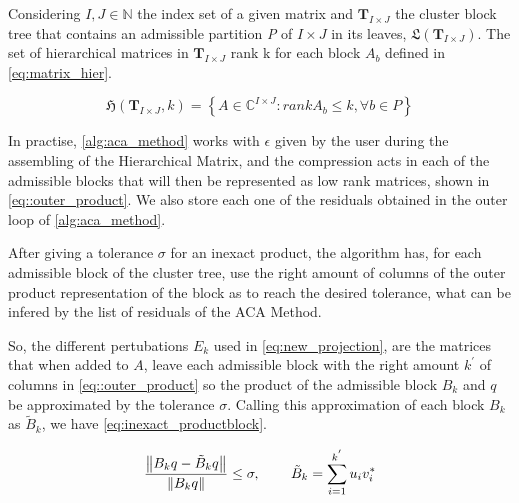 Considering $I,J \in \mathbb{N}$ the index set of a given matrix and $\mathbf{T}_{I \times J}$ the cluster block tree that contains an admissible partition \textit{P} of $ I \times J$ in its leaves, $\mathfrak{L}(\mathbf{T}_{I \times J})$. The set of hierarchical matrices in $\mathbf{T}_{I \times J}$ rank k for each block $A_{b}$ defined in \ref{eq:matrix_hier}.

\begin{equation}\label{eq:matrix_hier}
    \mathfrak{H}(\mathbf{T}_{I \times J},k) = \left\{  A\in \mathbb{C}^{I\times J} : rankA_{b} \leq k, \forall b \in P \right\}
\end{equation}


In practise, \ref{alg:aca_method} works with $\epsilon$ given by the user during the assembling of the Hierarchical Matrix, and the compression acts in each of the admissible blocks that will then be represented as low rank matrices, shown in \ref{eq::outer_product}. We also store each one of the residuals obtained in the outer loop of \ref{alg:aca_method}. 

After giving a tolerance $\sigma$ for an inexact product, the algorithm has, for each admissible block of the cluster tree, use the right amount of columns of the outer product representation of the block as to reach the desired tolerance, what can be infered by the list of residuals of the ACA Method.

So, the different pertubations $E_{k}$ used in \ref{eq:new_projection}, are the matrices that when added to $A$, leave each admissible block with the right amount $k^{'}$ of columns in \ref{eq::outer_product} so the product of the admissible block $B_{k}$ and $q$ be approximated by the tolerance $\sigma$. Calling this approximation of each block $B_{k}$ as $\tilde{B}_{k}$, we have \ref{eq:inexact_productblock}.

\begin{equation}\label{eq:inexact_productblock}
    \frac{\left\lVert B_{k}q - \tilde{B}_{k}q \right\rVert}{\left\lVert B_{k}q\right\rVert} \leq \sigma, \hspace{0.3in} \tilde{B}_{k} = \sum_{i=1} ^{k^{'}} u_{i} v_{i} ^{*}
\end{equation}




